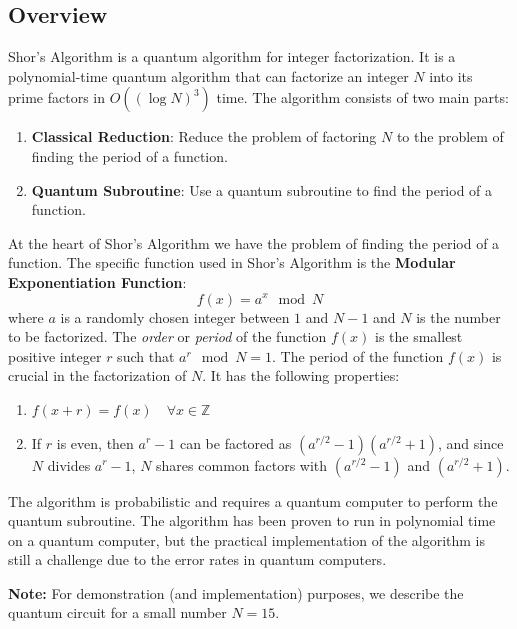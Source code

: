 \documentclass[12pt]{article}
\begin{document}
\subsection{Overview}
Shor's Algorithm is a quantum algorithm for integer factorization. It is a polynomial-time quantum algorithm that can factorize an integer $N$ into its prime factors in $O((\log N)^3)$ time. The algorithm consists of two main parts:
\begin{enumerate}
    \item \textbf{Classical Reduction}: Reduce the problem of factoring $N$ to the problem of finding the period of a function.
    \item \textbf{Quantum Subroutine}: Use a quantum subroutine to find the period of a function.
\end{enumerate}
\par\noindent At the heart of Shor's Algorithm we have the problem of finding the period of a function. The specific function used in Shor's Algorithm is the \textbf{Modular Exponentiation Function}:
$$f(x) = a^x \mod N$$
where $a$ is a randomly chosen integer between $1$ and $N-1$ and $N$ is the number to be factorized. The \textit{order} or \textit{period} of the function $f(x)$ is the smallest positive integer $r$ such that $a^r \mod N = 1$. The period of the function $f(x)$ is crucial in the factorization of $N$. It has the following properties:
\begin{enumerate}
    \item $f(x+r) = f(x) \quad \forall x \in \mathbb{Z}$
    \item If $r$ is even, then $a^r-1$ can be factored as $(a^{r/2}-1)(a^{r/2}+1)$, and since $N$ divides $a^r-1$, $N$ shares common factors with $(a^{r/2}-1)$ and $(a^{r/2}+1)$.
\end{enumerate}
\par\noindent The algorithm is probabilistic and requires a quantum computer to perform the quantum subroutine. The algorithm has been proven to run in polynomial time on a quantum computer, but the practical implementation of the algorithm is still a challenge due to the error rates in quantum computers.
\par\noindent \textbf{Note:} For demonstration (and implementation) purposes, we describe the quantum circuit for a small number $N=15$.
\end{document}
